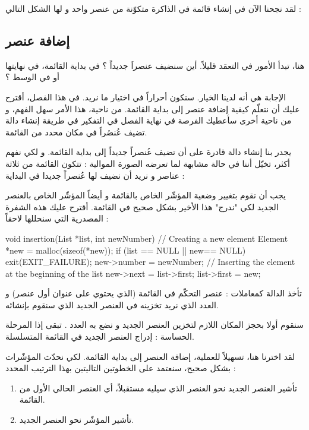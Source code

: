 لقد نجحنا الآن في إنشاء قائمة في الذاكرة متكوّنة من عنصر واحد و لها الشكل التالي :


\subsection{إضافة عنصر}

هنا، تبدأ الأمور في التعقد قليلاً. أين سنضيف عنصراَ جديداً ؟ في بداية القائمة، في نهايتها أو في الوسط ؟

الإجابة هي أنه لدينا الخيار. سنكون أحراراً في اختيار ما نريد. في هذا الفصل، أقترح عليك أن نتعلّم كيفية إضافة عنصر إلى بداية القائمة. من ناحية، هذا الأمر سهل الفهم، و من ناحية أخرى سأعطيك الفرصة في نهاية الفصل في التفكير في طريقة إنشاء دالة تضيف عُنصُراً في مكان محدد من القائمة.

يجدر بنا إنشاء دالة قادرة على أن تضيف عُنصراً جديداً إلى بداية القائمة. و لكي نفهم أكثر، تخيّل أننا في حالة مشابهة لما تعرضه الصورة الموالية : تتكون القائمة من ثلاثة عناصر و نريد أن نضيف لها عُنصراً جديدا في البداية :


يجب أن نقوم بتغيير وضعية المؤشّر
الخاص بالقائمة و أيضاً المؤشّر
الخاص بالعنصر الجديد لكي "ندرج" هذا الأخير بشكل صحيح في القائمة. أقترح عليك هذه الشفرة المصدرية التي سنحللها لاحقاً :

\begin{Csource}
void insertion(List *list, int newNumber)
{
	// Creating a new element
	Element *new = malloc(sizeof(*new));
	if (list == NULL || new== NULL)
	{
		exit(EXIT_FAILURE);
	}
	new->number = newNumber;	
	// Inserting the element at the beginning of the list
	new->next = list->first;
	list->first = new;
}
\end{Csource}

تأخذ الدالة
كمعاملات : عنصر التحكّم في القائمة (الذي يحتوي على عنوان أول عنصر) و العدد الذي نريد تخزينه في العنصر الجديد الذي سنقوم بإنشائه. 

سنقوم أولا بحجز المكان اللازم لتخزين العنصر الجديد و نضع به العدد
.
تبقى إذا المرحلة الحساسة : إدراج العنصر الجديد في القائمة المتسلسلة.

لقد اخترنا هنا، تسهيلاً للعملية، إضافة العنصر إلى بداية القائمة. لكي نحدّث المؤشّرات بشكل صحيح، سنعتمد على الخطوتين التاليتين بهذا الترتيب المحدد :

\begin{enumerate}
	\item تأشير العنصر الجديد نحو العنصر الذي سيليه مستقبلاً، أي العنصر الحالي الأول من القائمة.
	\item تأشير المؤشّر
	نحو العنصر الجديد.
\end{enumerate}

